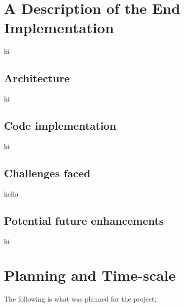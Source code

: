 \documentclass[]{final}
\begin{document}

\chapter{A Description of the End Implementation}
hi%
\section{Architecture}
hi%
\section{Code implementation}
hi%
\section{Challenges faced}
hello%
\section{Potential future enhancements}
hi%

\chapter{Planning and Time-scale}

The following is what was planned for the project;
\end{document}
